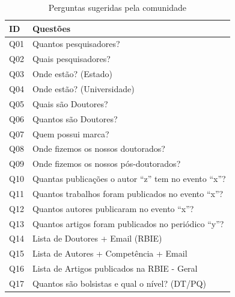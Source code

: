 \begin{table}[!ht]
	\centering
	\caption{Perguntas sugeridas pela comunidade}
	\label{tab:questions}
	\begin{tabular}{|l|l|}
		\hline
		ID  & Questões                                                                          \\ \hline
		Q01 & Quantos pesquisadores?                                                            \\ \hline
		Q02 & Quais pesquisadores?                                                              \\ \hline
		Q03 & Onde estão? (Estado)                                                              \\ \hline
		Q04 & Onde estão? (Universidade)                                                        \\ \hline
		Q05 & Quais são Doutores?                                                               \\ \hline
		Q06 & Quantos são Doutores?                                                             \\ \hline
		Q07 & Quem possui marca?                                                                \\ \hline
		Q08 & Onde fizemos os nossos doutorados?                                                \\ \hline
		Q09 & Onde fizemos os nossos pós-doutorados?                                            \\ \hline
		Q10 & Quantas publicações o autor “z” tem no evento “x”?                                \\ \hline
		Q11 & Quantos trabalhos foram publicados no evento “x”?                                 \\ \hline
		Q12 & Quantos autores publicaram no evento “x”?                                         \\ \hline
		Q13 & Quantos artigos foram publicados no periódico “y”?                                \\ \hline
		Q14 & Lista de Doutores + Email (RBIE)                                                  \\ \hline
		Q15 & Lista de Autores + Competência + Email                                            \\ \hline
		Q16 & Lista de Artigos publicados na RBIE - Geral                                       \\ \hline
		Q17 & Quantos são bolsistas e qual o nível? (DT/PQ)                                     \\ \hline

\end{tabular}
\end{table}
